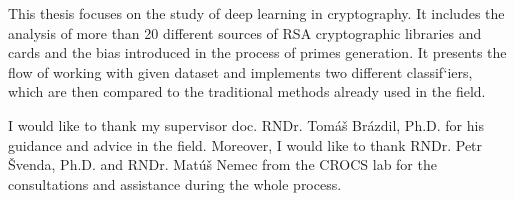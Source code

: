 
 {This thesis focuses on the study of deep learning in cryptography. It includes the analysis of more than 20 different sources of RSA cryptographic libraries and cards and the bias introduced in the process of primes generation. It presents the flow of working with given dataset and implements two different classif`iers, which are then compared to the traditional methods already used in the field.}

 {I would like to thank my supervisor doc. RNDr. Tomáš Brázdil, Ph.D. for his guidance and advice in the field. Moreover, I would like to thank RNDr. Petr Švenda, Ph.D. and RNDr. Matúš Nemec from the CROCS lab for the consultations and assistance during the whole process.}
